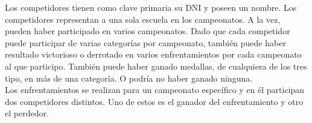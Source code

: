 Los competidores tienen como clave primaria su DNI y poseen un nombre. Los competidores representan a una sola escuela en
los campeonatos. A la vez, pueden haber participado en varios campeonatos. Dado que cada competidor puede participar
de varias categorías por campeonato, también puede haber resultado victorioso o derrotado en varios enfrentamientos por
cada campeonato al que participo. También puede haber ganado medallas, de cualquiera de los tres tipo, en más de una categoría.
O podría no haber ganado ninguna.\\

Los enfrentamientos se realizan para un campeonato específico y en él participan dos competidores distintos. Uno de estos
es el ganador del enfrentamiento y otro el perdedor.
